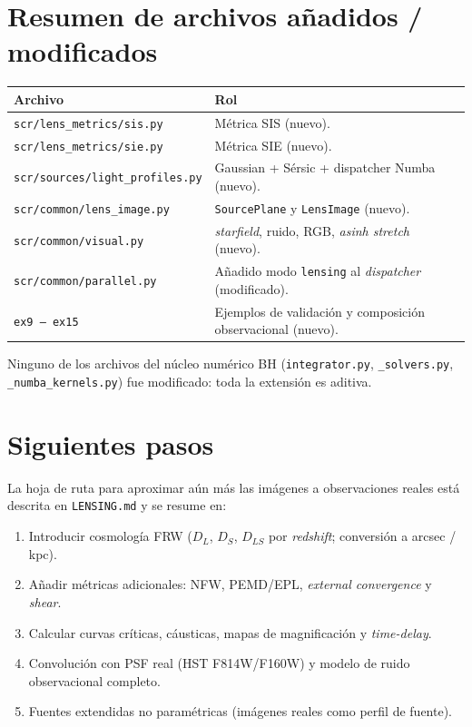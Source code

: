 \documentclass[11pt,a4paper]{article}
\begin{document}
\section{Resumen de archivos añadidos / modificados}

\begin{center}
\renewcommand{\arraystretch}{1.2}
\begin{tabular}{@{}p{5.4cm}p{10.5cm}@{}}
  \toprule
  \textbf{Archivo} & \textbf{Rol} \\
  \midrule
  \texttt{scr/lens\_metrics/sis.py} & Métrica SIS (nuevo). \\
  \texttt{scr/lens\_metrics/sie.py} & Métrica SIE (nuevo). \\
  \texttt{scr/sources/light\_profiles.py} &
    Gaussian + Sérsic + dispatcher Numba (nuevo). \\
  \texttt{scr/common/lens\_image.py} &
    \texttt{SourcePlane} y \texttt{LensImage} (nuevo). \\
  \texttt{scr/common/visual.py} &
    \emph{starfield}, ruido, RGB, \emph{asinh stretch} (nuevo). \\
  \texttt{scr/common/parallel.py} &
    Añadido modo \texttt{lensing} al \emph{dispatcher} (modificado). \\
  \texttt{ex9 -- ex15} &
    Ejemplos de validación y composición observacional (nuevo). \\
  \bottomrule
\end{tabular}
\end{center}

Ninguno de los archivos del núcleo numérico BH
(\texttt{integrator.py}, \texttt{\_solvers.py}, \texttt{\_numba\_kernels.py})
fue modificado: toda la extensión es aditiva.


\section{Siguientes pasos}

La hoja de ruta para aproximar aún más las imágenes a observaciones
reales está descrita en \texttt{LENSING.md} y se resume en:
\begin{enumerate}
  \item Introducir cosmología FRW ($D_L$, $D_S$, $D_{LS}$ por
        \emph{redshift}; conversión a arcsec / kpc).
  \item Añadir métricas adicionales: NFW, PEMD/EPL, \emph{external
        convergence} y \emph{shear}.
  \item Calcular curvas críticas, cáusticas, mapas de magnificación y
        \emph{time-delay}.
  \item Convolución con PSF real (HST F814W/F160W) y modelo de ruido
        observacional completo.
  \item Fuentes extendidas no paramétricas (imágenes reales como perfil
        de fuente).
\end{enumerate}
\end{document}
